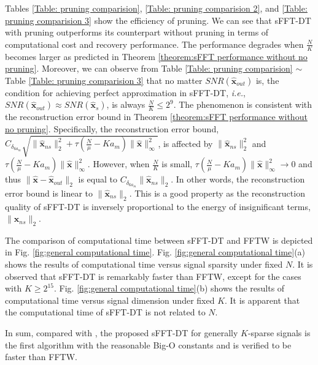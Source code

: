 \documentclass[journal,onecolumn,11pt]{IEEEtran}
\begin{document}
Tables \ref{Table: pruning comparision}, \ref{Table: pruning comparision 2}, and \ref{Table: pruning comparision 3}  show the efficiency of pruning.
We can see that sFFT-DT with pruning outperforms its counterpart without pruning in terms of computational cost and recovery performance.
The performance degrades when $\frac{N}{K}$ becomes larger as predicted in Theorem \ref{theorem:sFFT performance without no pruning}.
Moreover, we can observe from Table \ref{Table: pruning comparision} $\sim$ Table \ref{Table: pruning comparision 3} that  no matter $SNR(\bm{\hat{x}}_{out})$ is, the condition for achieving perfect approximation in sFFT-DT, {\em i.e.}, $SNR(\bm{\hat{x}}_{out})\approx SNR(\bm{\hat{x}}_s)$, is always $\frac{N}{K} \leq 2^9$.
The phenomenon is consistent with the reconstruction error bound in Theorem \ref{theorem:sFFT performance without no pruning}. Specifically, the reconstruction error bound, $ C_{\delta_{6a_{m}}}\sqrt{ \| \bm{\hat{x}}_{ns}\|_2^2 + \tau(   \frac{N}{\mu} -Ka_{m})\|  \bm{\hat{x}}  \|_\infty^{2} }$, is affected by $ \|\bm{\hat{x}}_{ns}\|_2^2 $ and  $\tau(   \frac{N}{\mu} -Ka_{m})\|  \bm{\hat{x}}  \|_\infty^{2}$.
However, when $ \frac{N}{K}$ is small, $\tau(   \frac{N}{\mu} -Ka_{m})\|  \bm{\hat{x}}  \|_\infty^{2} \rightarrow 0$ and thus $\| \bm{\hat{x}}-\bm{\hat{x}}_{out} \|_2$ is equal to $C_{\delta_{6a_{m}}} \| \bm{\hat{x}}_{ns}\|_2  $.
In other words, the reconstruction error bound is linear to $\| \bm{\hat{x}}_{ns}\|_2 $.
This is a good property as the reconstruction quality of sFFT-DT is inversely proportional to the energy of insignificant terms, $ \| \bm{\hat{x}}_{ns}\|_2 $.

The comparison of computational time between sFFT-DT and FFTW is depicted in Fig. \ref{fig:general computational time}.
Fig. \ref{fig:general computational time}(a) shows the results of computational time versus signal sparsity under fixed $N$.
It is observed that sFFT-DT is remarkably faster than FFTW, except for the cases with $K \geq 2^{15}$.
Fig. \ref{fig:general computational time}(b) shows the results of computational time versus signal dimension under fixed $K$.
It is apparent that the computational time of sFFT-DT is not related to $N$.

In sum, compared with \cite{Haitham2012}\cite{Haitham2012_1}, the proposed sFFT-DT for generally $K$-sparse signals is the first algorithm with the reasonable Big-O constants and is verified to be faster than FFTW.
\end{document}
